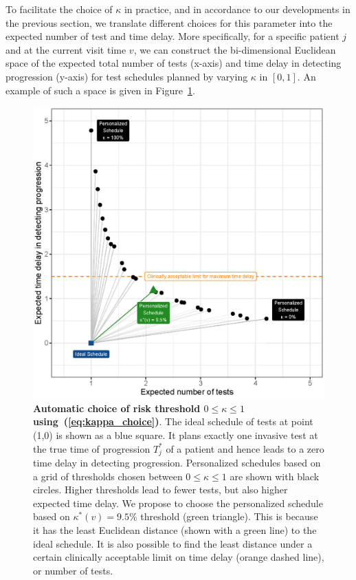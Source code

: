 To facilitate the choice of $\kappa$ in practice, and in accordance to our developments in the previous section, we translate different choices for this parameter into the expected number of test and time delay. More specifically, for a specific patient $j$ and at the current visit time $v$, we can construct the bi-dimensional Euclidean space of the expected total number of tests (x-axis) and time delay in detecting progression (y-axis) for test schedules planned by varying $\kappa$ in $[0, 1]$. An example of such a space is given in Figure~\ref{fig:kappa_choice}.
\begin{figure}
\centerline{\includegraphics{images/kappa_choice_102.eps}}
\caption{\textbf{Automatic choice of risk threshold $0 \leq \kappa \leq 1$ using~(\ref{eq:kappa_choice})}. The ideal schedule of tests at point (1,0) is shown as a blue square. It plans exactly one invasive test at the true time of progression $T^*_j$ of a patient and hence leads to a zero time delay in detecting progression. Personalized schedules based on a grid of thresholds chosen between $0 \leq \kappa \leq 1$ are shown with black circles. Higher thresholds lead to fewer tests, but also higher expected time delay. We propose to choose the personalized schedule based on $\kappa^*(v)=9.5\%$ threshold (green triangle). This is because it has the least Euclidean distance (shown with a green line) to the ideal schedule. It is also possible to find the least distance under a certain clinically acceptable limit on time delay (orange dashed line), or number of tests.}
\label{fig:kappa_choice}
\end{figure}
